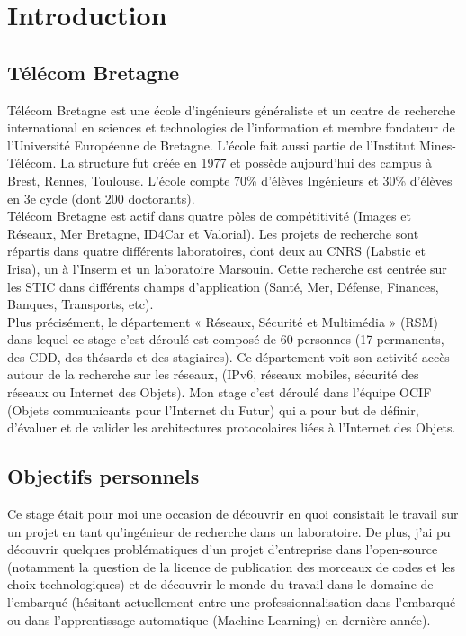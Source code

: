 \documentclass{article}
\begin{document}
\thispagestyle{empty}
\tableofcontents
\listoffigures
\newpage
\setcounter{page}{1}

\section{Introduction}
\subsection{Télécom Bretagne}
Télécom Bretagne est une école d'ingénieurs généraliste et un centre de recherche international en sciences et technologies de l'information et membre fondateur de l'Université Européenne de Bretagne. L'école fait aussi partie de l'Institut Mines-Télécom. La structure fut créée en 1977 et possède aujourd'hui des campus à Brest, Rennes, Toulouse. L'école compte 70\% d'élèves Ingénieurs et 30\% d'élèves en 3e cycle (dont 200 doctorants).\\
Télécom Bretagne est actif dans quatre pôles de compétitivité (Images et Réseaux, Mer Bretagne, ID4Car et Valorial). Les projets de recherche sont répartis dans quatre différents laboratoires, dont deux au CNRS (Labstic et Irisa), un à l'Inserm et un laboratoire Marsouin. Cette recherche est centrée sur les STIC dans différents champs d'application (Santé, Mer, Défense, Finances, Banques, Transports, etc).\\
Plus précisément, le département « Réseaux, Sécurité et Multimédia » (RSM) dans lequel ce stage c'est déroulé est composé de 60 personnes (17 permanents, des CDD, des thésards et des stagiaires). Ce département voit son activité accès autour de la recherche sur les réseaux, (IPv6, réseaux mobiles, sécurité des réseaux ou Internet des Objets). Mon stage c'est déroulé dans l'équipe OCIF (Objets communicants pour l'Internet du Futur) qui a pour but de définir, d’évaluer et de valider les architectures protocolaires liées à l’Internet des Objets.
\subsection{Objectifs personnels}
Ce stage était pour moi une occasion de découvrir en quoi consistait le travail sur un projet en tant qu'ingénieur de recherche dans un laboratoire. De plus, j'ai pu découvrir quelques problématiques d'un projet d'entreprise dans l'open-source (notamment la question de la licence de publication des morceaux de codes et les choix technologiques) et de découvrir le monde du travail dans le domaine de l'embarqué (hésitant actuellement entre une professionnalisation dans l'embarqué ou dans l'apprentissage automatique (Machine Learning) en dernière année).
\end{document}
